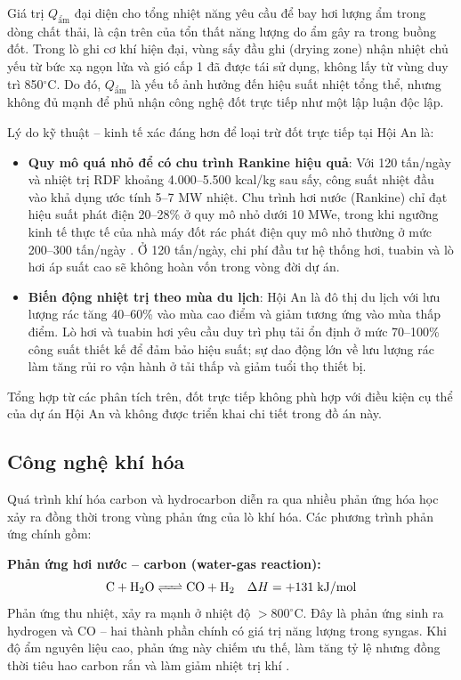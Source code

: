 \documentclass[../main.tex]{subfiles}
\begin{document}
Giá trị $Q_{\text{ẩm}}$ đại diện cho tổng nhiệt năng yêu cầu để bay hơi lượng ẩm trong dòng chất thải, là cận trên của tổn thất năng lượng do ẩm gây ra trong buồng đốt. Trong lò ghi cơ khí hiện đại, vùng sấy đầu ghi (drying zone) nhận nhiệt chủ yếu từ bức xạ ngọn lửa và gió cấp 1 đã được tái sử dụng, không lấy từ vùng duy trì 850$^\circ\mathrm{C}$. Do đó, $Q_{\text{ẩm}}$ là yếu tố ảnh hưởng đến hiệu suất nhiệt tổng thể, nhưng không đủ mạnh để phủ nhận công nghệ đốt trực tiếp như một lập luận độc lập.

Lý do kỹ thuật -- kinh tế xác đáng hơn để loại trừ đốt trực tiếp tại Hội An là:
\begin{itemize}
  \item \textbf{Quy mô quá nhỏ để có chu trình Rankine hiệu quả}: Với 120 tấn/ngày và nhiệt trị RDF khoảng 4.000--5.500 kcal/kg sau sấy, công suất nhiệt đầu vào khả dụng ước tính 5--7 MW nhiệt. Chu trình hơi nước (Rankine) chỉ đạt hiệu suất phát điện 20--28\% ở quy mô nhỏ dưới 10 MWe, trong khi ngưỡng kinh tế thực tế của nhà máy đốt rác phát điện quy mô nhỏ thường ở mức 200--300 tấn/ngày \cite{Arena2012}. Ở 120 tấn/ngày, chi phí đầu tư hệ thống hơi, tuabin và lò hơi áp suất cao sẽ không hoàn vốn trong vòng đời dự án.
  \item \textbf{Biến động nhiệt trị theo mùa du lịch}: Hội An là đô thị du lịch với lưu lượng rác tăng 40--60\% vào mùa cao điểm và giảm tương ứng vào mùa thấp điểm. Lò hơi và tuabin hơi yêu cầu duy trì phụ tải ổn định ở mức 70--100\% công suất thiết kế để đảm bảo hiệu suất; sự dao động lớn về lưu lượng rác làm tăng rủi ro vận hành ở tải thấp và giảm tuổi thọ thiết bị.
\end{itemize}

Tổng hợp từ các phân tích trên, đốt trực tiếp không phù hợp với điều kiện cụ thể của dự án Hội An và không được triển khai chi tiết trong đồ án này.

\subsection{Công nghệ khí hóa}
\label{sec:phan-tich-khi-hoa-dot-am}

Quá trình khí hóa carbon và hydrocarbon diễn ra qua nhiều phản ứng hóa học xảy ra đồng thời trong vùng phản ứng của lò khí hóa. Các phương trình phản ứng chính gồm:

\textbf{Phản ứng hơi nước -- carbon (water-gas reaction):}
\begin{equation}
\ce{C + H2O <=> CO + H2} \quad \Delta H = +131 \;\text{kJ/mol}
\label{eq:water-gas}
\end{equation}
Phản ứng thu nhiệt, xảy ra mạnh ở nhiệt độ $> 800^\circ\mathrm{C}$. Đây là phản ứng sinh ra hydrogen và CO -- hai thành phần chính có giá trị năng lượng trong syngas. Khi độ ẩm nguyên liệu cao, phản ứng này chiếm ưu thế, làm tăng tỷ lệ  nhưng đồng thời tiêu hao carbon rắn và làm giảm nhiệt trị khí \cite{McKendry2002}.
\end{document}
